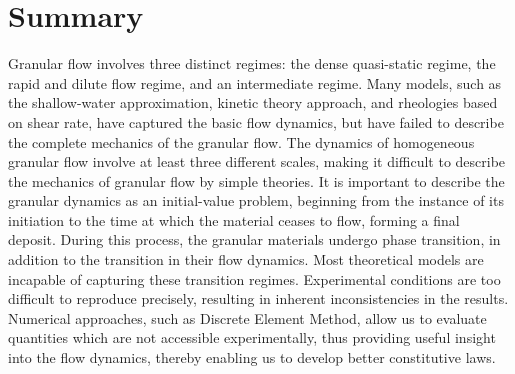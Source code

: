 \section{Summary}
Granular flow involves three distinct regimes: the dense quasi-static regime, 
the rapid and dilute flow regime, and an intermediate regime. Many models, such 
as the shallow-water approximation, kinetic theory approach, and rheologies 
based on shear rate, have captured the basic flow dynamics, but have failed to 
describe the complete mechanics of the granular flow. The dynamics of 
homogeneous granular flow involve at least three different scales, making it 
difficult to describe the mechanics of granular flow by simple theories. It is 
important to describe the granular dynamics as an initial-value problem, 
beginning from the instance of its initiation to the time at which the material 
ceases to flow, forming a final deposit. During this process, the granular 
materials undergo phase transition, in addition to the transition in their flow 
dynamics. Most theoretical models are incapable of capturing these transition 
regimes. Experimental conditions are too difficult to reproduce precisely, 
resulting in inherent inconsistencies in the results. Numerical 
approaches, such as Discrete Element Method, allow us to evaluate quantities 
which are not accessible experimentally, thus providing useful insight into the 
flow dynamics, thereby enabling us to develop better constitutive laws. 
